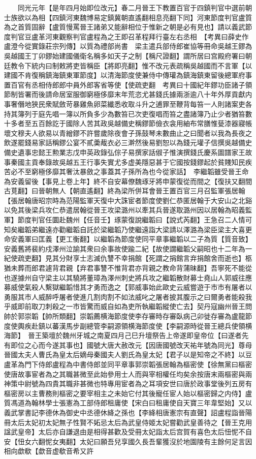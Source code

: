 　　同光元年【是年四月始即位改元】春二月晉王下教置百官于四鎮判官中選前朝士族欲以為相【四鎮河東魏博易定鎮冀朝直遙翻相息亮翻下同】河東節度判官盧質為之首質固辭【盧質慢罵晉王諸弟又能辭相位于惟新之朝是必有見也】請以義武節度判官豆盧革河東觀察判官盧程為之王即召革程拜行臺左右丞相　【考異曰薛史作盧澄今從實錄莊宗列傳】以質為禮部尚書　梁主遣兵部侍郎崔協等冊命吳越王鏐為吳越國王丁卯鏐始建國儀衛名稱多如天子之制【稱尺證翻】謂所居曰宫殿府署曰朝廷教令下統内曰制敕將吏皆稱臣【將即亮翻】惟不改元表疏稱吳越國而不言軍【以建國不肯復稱鎮海鎮東軍節度】以清海節度使兼侍中傳瓘為鎮海鎮東留後總軍府事置百官有丞相侍郎郎中員外郎客省等使【使疏吏翻　考異曰十國紀年鏐功臣諸子領節制皆署而後請命居室服御窮極侈靡末年荒恣尤甚錢氏據兩浙逾八十年外厚貢獻内事奢僭地狹民衆賦斂苛暴雞魚卵菜纎悉收取斗升之逋罪至鞭背每笞一人則諸案吏各持其簿列于庭先唱一簿以所負多少為數笞已次吏復唱而笞之盡諸簿乃止少者猶笞數十多者至五百餘訖于國除人苦其政吳越備史稱鏐節儉衣衾用紬布常膳惟甆漆器寢帳壞文穆夫人欲易以青繒鏐不許嘗歲除夜會子孫鼓琴未數曲止之曰聞者以我為長夜之飲遂罷錢易家話稱鏐公宴不貳羮胾衣必三澣然後易劉恕以為錢元瓘子信撰吳越備史備史遺事忠懿王勲業志戊申英政錄弘倧子易撰家話俶子惟演撰錢氏慶系圖譜家王故事秦國主貢奉錄故吳越五王行事失實尤多虚美隱惡甚于它國按錢鏐起於貧賤知民疾苦必不至窮極侈靡其奢汰暴斂之事蓋其子孫所為也今從家話】　李繼韜雖受晉王命為安義留後【事見上卷上年】終不自安幕僚魏琢牙將申蒙復從而間之【復扶又翻間古莧翻】曰晉朝無人【朝直遙翻】終為梁所併耳會晉王置百官三月召監軍張居翰【張居翰唐昭宗時為范陽監軍天復中大誅宦者節度使劉仁恭匿居翰于大安山之北谿以免其後梁兵攻仁恭遣居翰從晉王攻梁潞州以牽其兵晉遂取潞州因以居翰為昭義監軍】節度判官任圜赴魏州【任音壬】琢蒙復說繼韜曰【說式芮翻】王急召二人情可知矣繼韜弟繼遠亦勸繼韜自託於梁繼韜乃使繼遠詣大梁請以澤潞為梁臣梁主大喜更命安義軍曰匡義【更工衡翻】以繼韜為節度使同平章事繼韜以二子為質【質音致】安義舊將裴約戍澤州泣諭其衆曰余事故使踰二紀【故使謂繼韜父嗣昭也十二年為一紀使疏吏翻】見其分財享士志滅仇讐不幸捐館【死謂之捐館言弃捐館舍而逝也】柩猶未葬而郎君遽背君親【弃君事讐不惟背君亦背親之教命背蒲昧翻】吾寧死不能從也遂據州自守梁主以其驍將董璋為澤州刺史將兵攻之繼韜散財募士堯山人郭威往應募威使氣殺人繫獄繼韜惜其才勇而逸之【郭威事始此歐史云威嘗遊于市市有屠者以勇服其市人威醉呼屠者使進几割肉割不如法威叱之屠者披其腹示之曰爾勇者能殺我乎威即前取刀刺殺之一市皆驚而威自如為吏所執繼韜縱使亡去】契丹寇幽州晉王問帥於郭崇韜【帥所類翻】崇韜薦横海節度使李存審時存審臥病己卯徙存審為盧龍節度使輿疾赴鎮以蕃漢馬步副總管李嗣源領横海節度使【李嗣源時從晉王總兵使領横海節】　晉王築壇於魏州牙城之南夏四月己巳升壇祭告上帝遂即皇帝位【曰遂者先有即位之心而今遂其事也】國號大唐大赦改元【因唐國號改天祐年號為同光】尊母晉國太夫人曹氏為皇太后嫡母秦國夫人劉氏為皇太妃【君子以是知帝之不終】以豆盧革為門下侍郎盧程為中書侍郎並同平章事郭崇韜張居翰為樞密使【徐無黨曰樞密使唐故事宦者為之其職甚微至此始參用士人而與宰相權任均矣余按唐末兩樞密與兩神策中尉號為四貴其職非甚微也特專用宦者為之耳項安世曰唐於政事堂後列五房有樞密房以主曹務則樞密之要宰相主之未始它付其後寵任宦人始以樞密歸之内侍】盧質馮道為翰林學士張憲為工部侍郎租庸使【宋白曰租庸使自天寶三年韋堅始】又以義武掌書記李德休為御史中丞德休絳之孫也【李絳相唐憲宗有直聲】詔盧程詣晉陽冊太后太妃初太妃無子性賢不妬忌太后為武皇侍姬太妃嘗勸武皇善待之【晉王克用諡武皇帝】太后亦自謙退由是相得甚歡及受冊太妃詣太后宫賀有喜色太后忸怩不自安【忸女六翻怩女夷翻】太妃曰願吾兒享國久長吾輩獲沒於地園陵有主餘何足言因相向歔欷【歔音虚欷音希又許